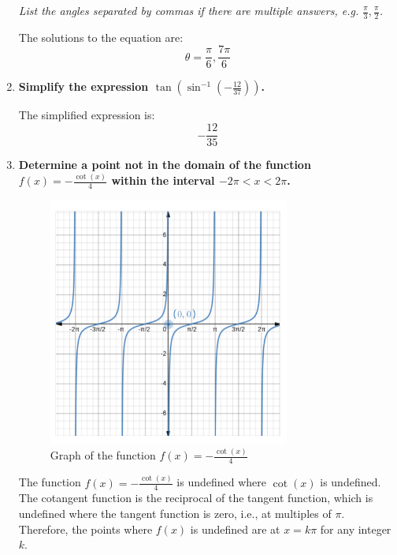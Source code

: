 \documentclass[12pt]{article}
\begin{document}
\begin{enumerate}
    \textit{List the angles separated by commas if there are multiple answers, e.g. \( \frac{\pi}{3}, \frac{\pi}{2} \).}
    
    The solutions to the equation are:
    \[ \theta = \frac{\pi}{6}, \frac{7\pi}{6} \]
    \vspace{45mm}
    
    \item \textbf{Simplify the expression \( \tan(\sin^{-1}(-\frac{12}{37})) \).}
    
    The simplified expression is:
    \[ -\frac{12}{35} \]
    \vspace{45mm}
  \newpage 
    
    \item \textbf{Determine a point not in the domain of the function \( f(x) = -\frac{\cot(x)}{4} \) within the interval \( -2\pi < x < 2\pi \).}

    \begin{figure}[h!]
    \centering
    \includegraphics[width=0.75\textwidth]{graph.png} %
    \caption{Graph of the function \( f(x) = -\frac{\cot(x)}{4} \)}
    \end{figure}

    The function \( f(x) = -\frac{\cot(x)}{4} \) is undefined where \( \cot(x) \) is undefined. The cotangent function is the reciprocal of the tangent function, which is undefined where the tangent function is zero, i.e., at multiples of \( \pi \). Therefore, the points where \( f(x) \) is undefined are at \( x = k\pi \) for any integer \( k \).


\end{enumerate}
\end{document}
